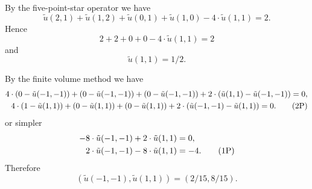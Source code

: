 \begin{loesung}
\begin{teilaufgaben}
\item
By the five-point-star operator we have
\begin{equation}
\tilde u(2,1) + \tilde u(1,2) + \tilde u(0,1) + \tilde u(1,0)
- 4 \cdot    \tilde u(1,1)
=
2.
\tag{1P}
\end{equation}
Hence
\[
2 + 2 + 0 + 0 - 4 \cdot \tilde u(1,1)
=
2
\]
and
\begin{equation}
\tilde u(1,1) = 1/2. \tag{1P}
\end{equation}

\vspace{5mm}

\item
By the finite volume method we have
\begin{align}
4 \cdot (0 - \tilde u(-1,-1)) + (0 - \tilde u(-1,-1)) + (0 - \tilde u(-1,-1))
+ 2 \cdot (\tilde u(1,1) - \tilde u(-1,-1))
=
0,
\notag
\\
4 \cdot (1 - \tilde u(1,1)) + (0 - \tilde u(1,1)) + (0 - \tilde u(1,1))
+ 2 \cdot (\tilde u(-1,-1) - \tilde u(1,1)) = 0.
\tag{2P}
\end{align}
or simpler
\begin{align}
-8 \cdot \tilde u(-1,-1) + 2 \cdot \tilde u(1,1) &= 0,
\notag
\\
2 \cdot \tilde u(-1,-1) -8 \cdot \tilde u(1,1) &= -4.  \tag{1P}
\end{align}
Therefore
\begin{equation}
(\tilde u(-1,-1), \tilde u(1,1))
=
(2/15, 8/15). \tag{1P}
\end{equation}
\end{teilaufgaben}
\end{loesung}
